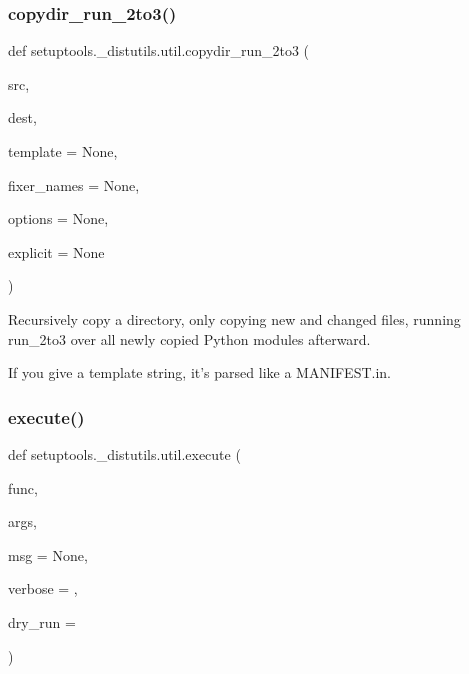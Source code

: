 \subsubsection{\texorpdfstring{copydir\+\_\+run\+\_\+2to3()}{copydir\_run\_2to3()}}
{\footnotesize\ttfamily def setuptools.\+\_\+distutils.\+util.\+copydir\+\_\+run\+\_\+2to3 (\begin{DoxyParamCaption}\item[{}]{src,  }\item[{}]{dest,  }\item[{}]{template = {\ttfamily None},  }\item[{}]{fixer\+\_\+names = {\ttfamily None},  }\item[{}]{options = {\ttfamily None},  }\item[{}]{explicit = {\ttfamily None} }\end{DoxyParamCaption})}

\begin{DoxyVerb}Recursively copy a directory, only copying new and changed files,
running run_2to3 over all newly copied Python modules afterward.

If you give a template string, it's parsed like a MANIFEST.in.
\end{DoxyVerb}
 \mbox{\label{namespacesetuptools_1_1__distutils_1_1util_a684b77f15dd1a33223d040956be1d5d8}} 
\subsubsection{\texorpdfstring{execute()}{execute()}}
{\footnotesize\ttfamily def setuptools.\+\_\+distutils.\+util.\+execute (\begin{DoxyParamCaption}\item[{}]{func,  }\item[{}]{args,  }\item[{}]{msg = {\ttfamily None},  }\item[{}]{verbose = {},  }\item[{}]{dry\+\_\+run = {} }\end{DoxyParamCaption})}

